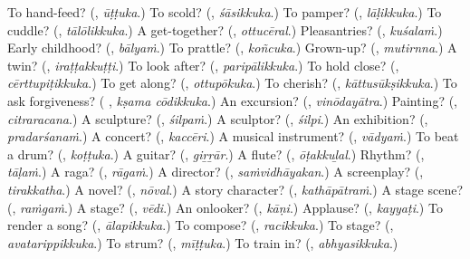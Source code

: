 \begin{tcolorbox}[breakable,colback=teal!4,colframe=teal!35!black,title={Before you move on}]
To hand-feed? (\textbf{}, \emph{ūṭṭuka}.) To scold? (\textbf{}, \emph{śāsikkuka}.) To pamper? (\textbf{}, \emph{lāḷikkuka}.) To cuddle? (\textbf{}, \emph{tālōlikkuka}.) A get-together? (\textbf{}, \emph{ottucēral}.) Pleasantries? (\textbf{}, \emph{kuśalaṁ}.) Early childhood? (\textbf{}, \emph{bālyaṁ}.) To prattle? (\textbf{}, \emph{koñcuka}.) Grown-up? (\textbf{}, \emph{mutirnna}.) A twin? (\textbf{}, \emph{iraṭṭakkuṭṭi}.) To look after? (\textbf{}, \emph{paripālikkuka}.) To hold close? (\textbf{}, \emph{cērttupiṭikkuka}.) To get along? (\textbf{}, \emph{ottupōkuka}.) To cherish? (\textbf{}, \emph{kāttusūkṣikkuka}.) To ask forgiveness? (\textbf{ }, \emph{kṣama cōdikkuka}.) An excursion? (\textbf{}, \emph{vinōdayātra}.) Painting? (\textbf{}, \emph{citraracana}.) A sculpture? (\textbf{}, \emph{śilpaṁ}.) A sculptor? (\textbf{}, \emph{śilpi}.) An exhibition? (\textbf{}, \emph{pradarśanaṁ}.) A concert? (\textbf{}, \emph{kaccēri}.) A musical instrument? (\textbf{}, \emph{vādyaṁ}.) To beat a drum? (\textbf{}, \emph{koṭṭuka}.) A guitar? (\textbf{}, \emph{giṟṟār}.) A flute? (\textbf{}, \emph{ōṭakkuḻal}.) Rhythm? (\textbf{}, \emph{tāḷaṁ}.) A raga? (\textbf{}, \emph{rāgaṁ}.) A director? (\textbf{}, \emph{saṁvidhāyakan}.) A screenplay? (\textbf{}, \emph{tirakkatha}.) A novel? (\textbf{}, \emph{nōval}.) A story character? (\textbf{}, \emph{kathāpātraṁ}.) A stage scene? (\textbf{}, \emph{raṁgaṁ}.) A stage? (\textbf{}, \emph{vēdi}.) An onlooker? (\textbf{}, \emph{kāṇi}.) Applause? (\textbf{}, \emph{kayyaṭi}.) To render a song? (\textbf{}, \emph{ālapikkuka}.) To compose? (\textbf{}, \emph{racikkuka}.) To stage? (\textbf{}, \emph{avatarippikkuka}.) To strum? (\textbf{}, \emph{mīṭṭuka}.) To train in? (\textbf{}, \emph{abhyasikkuka}.)
\end{tcolorbox}
